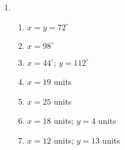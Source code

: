 {\begin{multicols}{3}
\begin{enumerate}[noitemsep, label=\textbf{\arabic*}. ]
\item %
      \begin{enumerate}[noitemsep, label=\textbf{(\alph*)} ]
\item $x=y=72^{\circ}$
\item $x=98^{\circ}$
\item $x=44^{\circ}$; $y=112^{\circ}$
\item $x=19$ units
\item $x=25$ units
\item $x=18$ units; $y=4$ units
\item $x=12$ units; $y=13$ units
      \end{enumerate}

\end{enumerate}


% 
% 



\end{multicols}}
